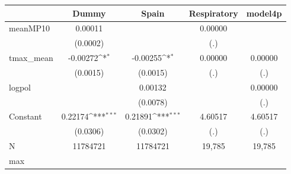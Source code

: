 {
\def\sym#1{\ifmmode^{#1}\else\(^{#1}\)\fi}
\begin{tabular}{l*{4}{c}}
\toprule
            &\multicolumn{1}{c}{Dummy}&\multicolumn{1}{c}{Spain}&\multicolumn{1}{c}{Respiratory}&\multicolumn{1}{c}{model4p}\\
\midrule
meanMP10    &     0.00011         &                     &     0.00000         &                     \\
            &    (0.0002)         &                     &         (.)         &                     \\
tmax\_mean   &    -0.00272\sym{*}  &    -0.00255\sym{*}  &     0.00000         &     0.00000         \\
            &    (0.0015)         &    (0.0015)         &         (.)         &         (.)         \\
logpol      &                     &     0.00132         &                     &     0.00000         \\
            &                     &    (0.0078)         &                     &         (.)         \\
Constant    &     0.22174\sym{***}&     0.21891\sym{***}&     4.60517         &     4.60517         \\
            &    (0.0306)         &    (0.0302)         &         (.)         &         (.)         \\
\midrule
N           &    11784721         &    11784721         &      19,785         &      19,785         \\
max         &                     &                     &                     &                     \\
\bottomrule
\end{tabular}
}
